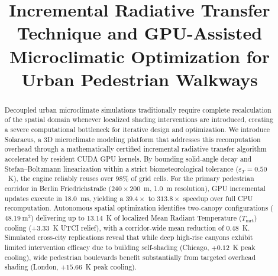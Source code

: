 \documentclass[conference]{IEEEtran}
\newcommand{\Tmrt}{T_{\mathrm{mrt}}}
\begin{document}
\title{Incremental Radiative Transfer Technique and GPU-Assisted Microclimatic Optimization for Urban Pedestrian Walkways}

\author{
\and
{}
}

\maketitle

\begin{abstract}
Decoupled urban microclimate simulations traditionally require complete recalculation of the spatial domain whenever localized shading interventions are introduced, creating a severe computational bottleneck for iterative design and optimization. We introduce Solaraeus, a 3D microclimate modeling platform that addresses this recomputation overhead through a mathematically certified incremental radiative transfer algorithm accelerated by resident CUDA GPU kernels. By bounding solid-angle decay and Stefan--Boltzmann linearization within a strict biometeorological tolerance ($\varepsilon_T = 0.50$~K), the engine reliably reuses over 98\% of grid cells. For the primary pedestrian corridor in Berlin Friedrichstra{\ss}e ($240\times 200$~m, 1.0~m resolution), GPU incremental updates execute in 18.0~ms, yielding a $39.4\times$ to $313.8\times$ speedup over full CPU recomputation. Autonomous spatial optimization identifies two-canopy configurations ($48.19~\mathrm{m}^2$) delivering up to 13.14~K of localized Mean Radiant Temperature ($\Tmrt$) cooling ($+3.33$~K UTCI relief), with a corridor-wide mean reduction of 0.48~K. Simulated cross-city replications reveal that while deep high-rise canyons exhibit limited intervention efficacy due to building self-shading (Chicago, $+0.12$~K peak cooling), wide pedestrian boulevards benefit substantially from targeted overhead shading (London, $+15.66$~K peak cooling).
\end{abstract}
\end{document}
